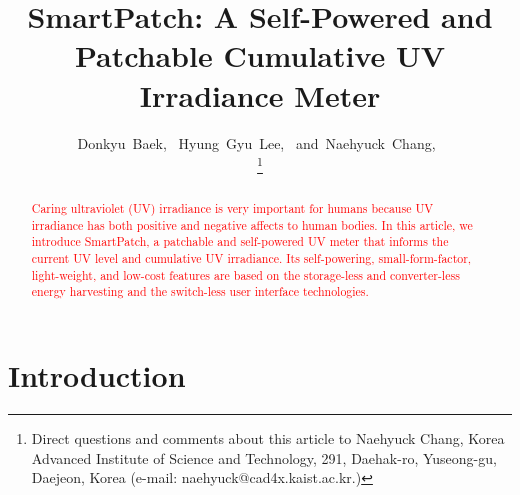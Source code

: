 \documentclass[journal]{IEEEtran}
\begin{document}
\title{SmartPatch: A Self-Powered and Patchable Cumulative UV Irradiance Meter}

\author{
	Donkyu~Baek,~
	Hyung~Gyu~Lee,~
	and~Naehyuck~Chang,~

\thanks{Direct questions and comments about this article to Naehyuck Chang, Korea Advanced Institute of Science and Technology, 291, Daehak-ro, Yuseong-gu, Daejeon, Korea (e-mail: naehyuck@cad4x.kaist.ac.kr.)}
}

\maketitle

\begin{abstract}
\textcolor{red}{Caring ultraviolet (UV) irradiance is very important for humans because UV irradiance has both positive and negative affects to human bodies. In this article, we introduce SmartPatch, a patchable and self-powered UV meter that informs the current UV level and cumulative UV irradiance.  Its self-powering, small-form-factor, light-weight, and low-cost features are based on the storage-less and converter-less energy harvesting and the switch-less user interface technologies.} 
\end{abstract}



\section{Introduction}
\end{document}
